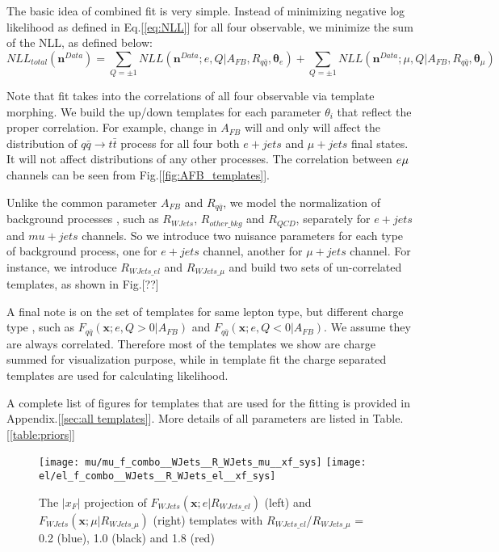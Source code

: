 \documentclass{cmspaperpdf}
\begin{document}
The basic idea of combined fit is very simple. Instead of minimizing negative log likelihood as defined in Eq.[\ref{eq:NLL}] for all four observable, we minimize the sum of the NLL, as defined below:
\begin{equation}
NLL_{total} (\bm n^{Data}) = \sum_{Q=\pm 1} NLL(\bm n^{Data};e, Q |A_{FB},R_{q\bar{q}},\bm \theta_{e}) +  \sum_{Q=\pm 1} NLL(\bm n^{Data};\mu, Q |A_{FB},R_{q\bar{q}},\bm \theta_{\mu})
\end{equation}

Note that fit takes into the correlations of all four observable via template morphing. We build the up/down templates for each parameter $\theta_i$ that reflect the proper correlation. For example, change in $A_{FB}$ will and only will affect the distribution of $q\bar{q}\rightarrow t\bar{t}$ process for all four both $e+jets$ and $\mu + jets$ final states. It will not affect distributions of any other processes. The correlation between $e\/\mu$ channels can be seen from Fig.[\ref{fig:AFB_templates}].

Unlike the common parameter $A_{FB}$ and $R_{q\bar{q}}$, we model the normalization of background processes , such as $R_{WJets}$, $R_{other\_bkg}$ and $R_{QCD}$, separately for $e+jets$ and $mu+jets$ channels. So we introduce two nuisance parameters for each type of background process, one for $e+jets$ channel, another for $\mu+jets$ channel. For instance, we introduce $R_{WJets\_el}$ and $R_{WJets\_\mu}$ and build two sets of un-correlated templates, as shown in Fig.[??]

A final note is on the set of templates for same lepton type, but different charge type , such as $F_{q\bar{q}}(\bm x;e,Q>0|A_{FB})$ and $F_{q\bar{q}}(\bm x;e,Q<0|A_{FB})$. We assume they are always correlated. Therefore most of the templates we show are charge summed for visualization purpose, while in template fit the charge separated templates are used for calculating likelihood.

A complete list of figures for templates that are used for the fitting is provided in Appendix.[\ref{sec:all templates}]. More details of all parameters are listed in Table.[\ref{table:priors}]

\begin{figure}[hbt]
  \begin{center}
    \texttt{[image: mu/mu\_f\_combo\_\_WJets\_\_R\_WJets\_mu\_\_xf\_sys]}
    \texttt{[image: el/el\_f\_combo\_\_WJets\_\_R\_WJets\_el\_\_xf\_sys]}

  \caption{\small The $|x_F|$ projection of $F_{WJets}(\bm x;e|R_{WJets\_el})$ (left) and $F_{WJets}(\bm x;\mu|R_{WJets\_\mu})$ (right) templates with $R_{WJets\_el}$/$R_{WJets\_\mu}$ = 0.2 (blue), 1.0 (black) and 1.8 (red)}
    \label{fig:gg_SF_bkg_templates}
  \end{center}
\end{figure}
\end{document}
